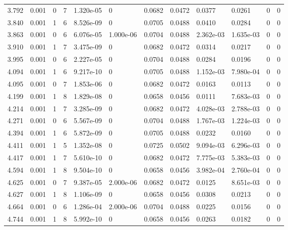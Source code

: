 \documentclass[preview]{standalone}
\begin{document}
{{{\begin{tabular}{L{1.2cm}C{1.2cm} C{0.3cm}C{0.5cm} C{1.4cm}C{1.4cm} C{1.4cm}C{1.4cm} C{1.6cm}C{1.6cm} C{1.6cm}C{1.6cm}}
  3.792  &  0.001  & 0     &  7 &  1.320e-05  & 0  &  0.0682&   0.0472& 0.0377 & 0.0261   &  0 & 0  \\ 
  3.840  &  0.001  & 1     &  6 &  8.526e-09  & 0  &  0.0705&   0.0488& 0.0410 & 0.0284   &  0 & 0  \\ 
  3.863  &  0.001  & 0     &  6 &  6.076e-05  & 1.000e-06  &  0.0704&   0.0488& 2.362e-03 & 1.635e-03   &  0 & 0  \\ 
  3.910  &  0.001  & 1     &  7 &  3.475e-09  & 0  &  0.0682&   0.0472& 0.0314 & 0.0217   &  0 & 0  \\ 
  3.995  &  0.001  & 0     &  6 &  2.227e-05  & 0  &  0.0704&   0.0488& 0.0284 & 0.0196   &  0 & 0  \\ 
  4.094  &  0.001  & 1     &  6 &  9.217e-10  & 0  &  0.0705&   0.0488& 1.152e-03 & 7.980e-04   &  0 & 0  \\ 
  4.095  &  0.001  & 0     &  7 &  1.853e-06  & 0  &  0.0682&   0.0472& 0.0163 & 0.0113   &  0 & 0  \\ 
  4.199  &  0.001  & 1     &  8 &  1.829e-08  & 0  &  0.0658&   0.0456& 0.0111 & 7.683e-03   &  0 & 0  \\ 
  4.214  &  0.001  & 1     &  7 &  3.285e-09  & 0  &  0.0682&   0.0472& 4.028e-03 & 2.788e-03   &  0 & 0  \\ 
  4.271  &  0.001  & 0     &  6 &  5.567e-09  & 0  &  0.0704&   0.0488& 1.767e-03 & 1.224e-03   &  0 & 0  \\ 
  4.394  &  0.001  & 1     &  6 &  5.872e-09  & 0  &  0.0705&   0.0488& 0.0232 & 0.0160   &  0 & 0  \\ 
  4.411  &  0.001  & 1     &  5 &  1.352e-08  & 0  &  0.0725&   0.0502& 9.094e-03 & 6.296e-03   &  0 & 0  \\ 
  4.417  &  0.001  & 1     &  7 &  5.610e-10  & 0  &  0.0682&   0.0472& 7.775e-03 & 5.383e-03   &  0 & 0  \\ 
  4.594  &  0.001  & 1     &  8 &  9.504e-10  & 0  &  0.0658&   0.0456& 3.982e-04 & 2.760e-04   &  0 & 0  \\ 
  4.625  &  0.001  & 0     &  7 &  9.387e-05  & 2.000e-06  &  0.0682&   0.0472& 0.0125 & 8.651e-03   &  0 & 0  \\ 
  4.627  &  0.001  & 1     &  8 &  1.106e-09  & 0  &  0.0658&   0.0456& 0.0308 & 0.0213   &  0 & 0  \\ 
  4.664  &  0.001  & 0     &  6 &  1.286e-04  & 2.000e-06  &  0.0704&   0.0488& 0.0225 & 0.0156   &  0 & 0  \\ 
  4.744  &  0.001  & 1     &  8 &  5.992e-10  & 0  &  0.0658&   0.0456& 0.0263 & 0.0182   &  0 & 0  \\ 

\end{tabular}}}}
\end{document}
